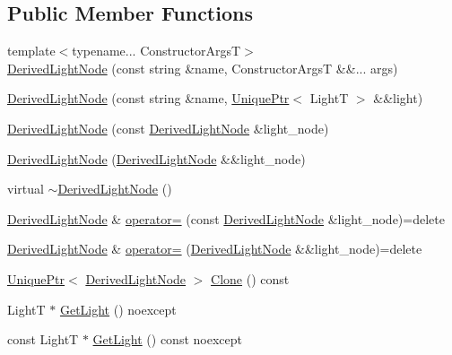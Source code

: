 \subsection*{Public Member Functions}
\begin{DoxyCompactItemize}
\item 
{\footnotesize template$<$typename... Constructor\+ArgsT$>$ }\\\hyperlink{classmage_1_1_derived_light_node_a64003a60d92c245c8ad247bb16724852}{Derived\+Light\+Node} (const string \&name, Constructor\+ArgsT \&\&... args)
\item 
\hyperlink{classmage_1_1_derived_light_node_ab3e68ce3299581459843e8ad12f18464}{Derived\+Light\+Node} (const string \&name, \hyperlink{namespacemage_a3316d7143a973e37adf1110f2e80ca31}{Unique\+Ptr}$<$ LightT $>$ \&\&light)
\item 
\hyperlink{classmage_1_1_derived_light_node_a719b8fe088b93a7ecfb6d21b99cc170b}{Derived\+Light\+Node} (const \hyperlink{classmage_1_1_derived_light_node}{Derived\+Light\+Node} \&light\+\_\+node)
\item 
\hyperlink{classmage_1_1_derived_light_node_af99017273f3f8bedcbd3842c31e4ecc4}{Derived\+Light\+Node} (\hyperlink{classmage_1_1_derived_light_node}{Derived\+Light\+Node} \&\&light\+\_\+node)
\item 
virtual \hyperlink{classmage_1_1_derived_light_node_ad4b2371e323d30eda05744237d4dc4eb}{$\sim$\+Derived\+Light\+Node} ()
\item 
\hyperlink{classmage_1_1_derived_light_node}{Derived\+Light\+Node} \& \hyperlink{classmage_1_1_derived_light_node_ad4a81ae2a671d6c278c74dead4660949}{operator=} (const \hyperlink{classmage_1_1_derived_light_node}{Derived\+Light\+Node} \&light\+\_\+node)=delete
\item 
\hyperlink{classmage_1_1_derived_light_node}{Derived\+Light\+Node} \& \hyperlink{classmage_1_1_derived_light_node_a7eabbc97578958f97a7ec11728364eec}{operator=} (\hyperlink{classmage_1_1_derived_light_node}{Derived\+Light\+Node} \&\&light\+\_\+node)=delete
\item 
\hyperlink{namespacemage_a3316d7143a973e37adf1110f2e80ca31}{Unique\+Ptr}$<$ \hyperlink{classmage_1_1_derived_light_node}{Derived\+Light\+Node} $>$ \hyperlink{classmage_1_1_derived_light_node_a38fcbc8d5204f92d0dfd87c1c6d10281}{Clone} () const
\item 
LightT $\ast$ \hyperlink{classmage_1_1_derived_light_node_a1f45fa421b75d663a360bfdd518a1a1d}{Get\+Light} () noexcept
\item 
const LightT $\ast$ \hyperlink{classmage_1_1_derived_light_node_a61ace20169a3924d42abc163ebddc19b}{Get\+Light} () const noexcept
\end{DoxyCompactItemize}
